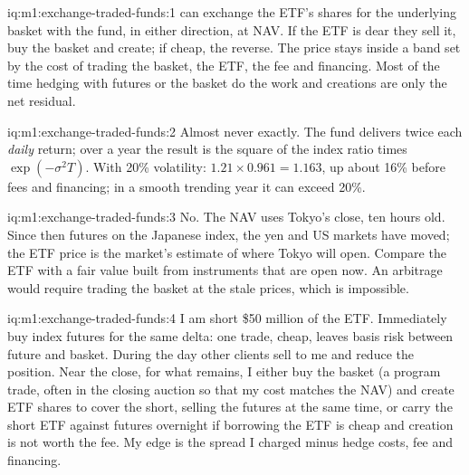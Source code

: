 \begin{solution}{iq:m1:exchange-traded-funds:1}
 can exchange the ETF's shares for the underlying
basket with the fund, in either direction, at NAV. If the ETF is dear they
sell it, buy the basket and create; if cheap, the reverse. The price stays
inside a band set by the cost of trading the basket, the ETF, the fee and
financing. Most of the time  hedging with futures or the basket
do the work and creations are only the net residual.
\end{solution}

\begin{solution}{iq:m1:exchange-traded-funds:2}
Almost never exactly. The fund delivers twice each \emph{daily} return; over
a year the result is the square of the index ratio times
$\exp(-\sigma^2 T)$. With 20\% volatility: $1.21 \times 0.961 = 1.163$, up
about 16\% before fees and financing; in a smooth trending year it can exceed
20\%.
\end{solution}

\begin{solution}{iq:m1:exchange-traded-funds:3}
No. The NAV uses Tokyo's close, ten hours old. Since then futures on the
Japanese index, the yen and US markets have moved; the ETF price is the
market's estimate of where Tokyo will open. Compare the ETF with a fair value
built from instruments that are open now. An arbitrage would require trading
the basket at the stale prices, which is impossible.
\end{solution}

\begin{solution}{iq:m1:exchange-traded-funds:4}
I am short \$50 million of the ETF. Immediately buy index futures for the
same delta: one trade, cheap, leaves basis risk between future and basket.
During the day other clients sell to me and reduce the position. Near the
close, for what remains, I either buy the basket (a program trade, often in
the closing auction so that my cost matches the NAV) and create ETF shares to
cover the short, selling the futures at the same time, or carry the short
ETF against futures overnight if borrowing the ETF is cheap and creation is
not worth the fee. My edge is the spread I charged minus hedge costs, fee and
financing.
\end{solution}

